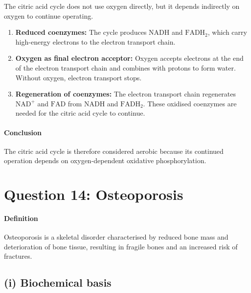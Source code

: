 \documentclass[11pt]{article}
\begin{document}
The citric acid cycle does not use oxygen directly, but it depends indirectly on oxygen to continue operating.

\begin{enumerate}
    \item \textbf{Reduced coenzymes:} The cycle produces \(\mathrm{NADH}\) and \(\mathrm{FADH_2}\), which carry high-energy electrons to the electron transport chain.
    \item \textbf{Oxygen as final electron acceptor:} Oxygen accepts electrons at the end of the electron transport chain and combines with protons to form water. Without oxygen, electron transport stops.
    \item \textbf{Regeneration of coenzymes:} The electron transport chain regenerates \(\mathrm{NAD^+}\) and \(\mathrm{FAD}\) from \(\mathrm{NADH}\) and \(\mathrm{FADH_2}\). These oxidised coenzymes are needed for the citric acid cycle to continue.
\end{enumerate}

\paragraph{Conclusion}
The citric acid cycle is therefore considered aerobic because its continued operation depends on oxygen-dependent oxidative phosphorylation.

\section*{Question 14: Osteoporosis}

\paragraph{Definition}
Osteoporosis is a skeletal disorder characterised by reduced bone mass and deterioration of bone tissue, resulting in fragile bones and an increased risk of fractures.

\subsection*{(i) Biochemical basis}
\end{document}
